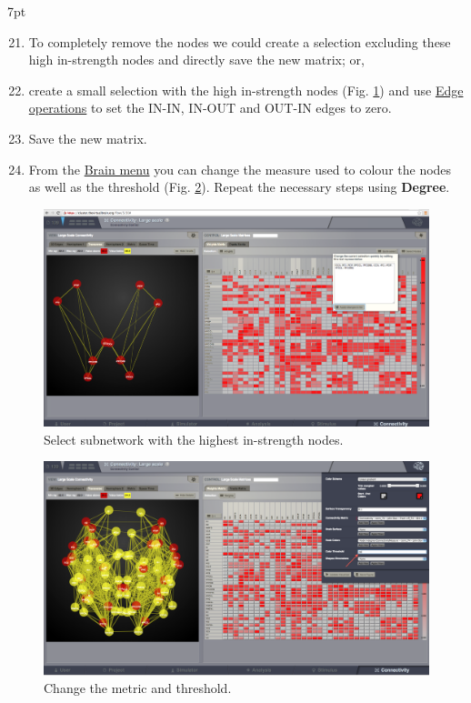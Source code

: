 \documentclass{tufte-handout}
\newenvironment{formal}{%
  \def\FrameCommand{%
    \hspace{1pt}%
    {\color{DarkBlue}\vrule width 2pt}%
    {\color{formalshade}\vrule width 4pt}%
    \colorbox{formalshade}%
  }%
  \MakeFramed{\advance\hsize-\width\FrameRestore}%
  \noindent\hspace{-4.55pt}%
  \begin{adjustwidth}{}{7pt}%
  \vspace{2pt}\vspace{2pt}%
}
{%
  \vspace{2pt}\end{adjustwidth}\endMakeFramed%
}
\begin{document}
\begin{formal}
  \begin{enumerate}[resume] %
  \setcounter{enumi}{20}
\item To completely remove the nodes we could create a selection excluding these
high in-strength nodes and directly save the new matrix; or,
\item create a small selection with the high in-strength nodes (Fig. \ref{fig:step_subnetwork}) and use \underline{Edge operations} to  set the IN-IN, IN-OUT and OUT-IN edges to zero. 
\item Save the new matrix.
\item From the \underline{Brain menu}
 you can change the measure used to colour the nodes as well as the threshold  (Fig. \ref{fig:step_change_threshold}). Repeat the necessary steps using \textbf{Degree}. 

  \end{enumerate}
\end{formal}

\begin{figure}[h]
  \includegraphics[width=0.9\linewidth]{Handout_UI_ModellingStructuralLesions_SelectSubnetwork}%
  \caption{Select subnetwork with the highest in-strength nodes.}%
  \label{fig:step_subnetwork}%
\end{figure}
\newpage




\begin{figure}[h]
  \includegraphics[width=0.9\linewidth]{Handout_UI_ModellingStructuralLesions_ChangeNodeColourThreshold}%
  \caption{Change the metric and threshold.}%
  \label{fig:step_change_threshold}%
\end{figure}
\newpage
\end{document}
